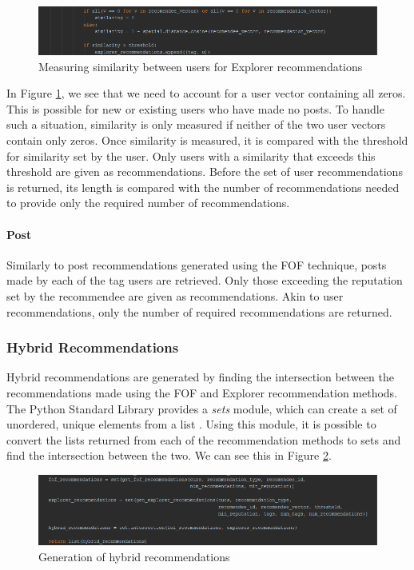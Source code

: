 \begin{figure}[H]
\centering
\includegraphics[width=\textwidth]{Images/Implementation/ExplorerSimilarity}
\caption{Measuring similarity between users for Explorer recommendations}
\label{fig:ExplorerSimilarity}
\end{figure}

\noindent In Figure \ref{fig:ExplorerSimilarity}, we see that we need to account for a user vector containing all zeros. This is possible for new or existing users who have made no posts. To handle such a situation, similarity is only measured if neither of the two user vectors contain only zeros. Once similarity is measured, it is compared with the threshold for similarity set by the user. Only users with a similarity that exceeds this threshold are given as recommendations. Before the set of user recommendations is returned, its length is compared with the number of recommendations needed to provide only the required number of recommendations. 

\paragraph{Post} Similarly to post recommendations generated using the FOF technique, posts made by each of the tag users are retrieved. Only those exceeding the reputation set by the recommendee are given as recommendations. Akin to user recommendations, only the number of required recommendations are returned.

\subsubsection{Hybrid Recommendations}
Hybrid recommendations are generated by finding the intersection between the recommendations made using the FOF and Explorer recommendation methods. The Python Standard Library provides a \textit{sets} module, which can create a set of unordered, unique elements from a list \cite{Python:Sets}. Using this module, it is possible to convert the lists returned from each of the recommendation methods to sets and find the intersection between the two. We can see this in Figure \ref{fig:HybridRecommendations}.

\begin{figure}[H]
\centering
\includegraphics[width=\textwidth]{Images/Implementation/HybridRecommendations}
\caption{Generation of hybrid recommendations}
\label{fig:HybridRecommendations}
\end{figure}

